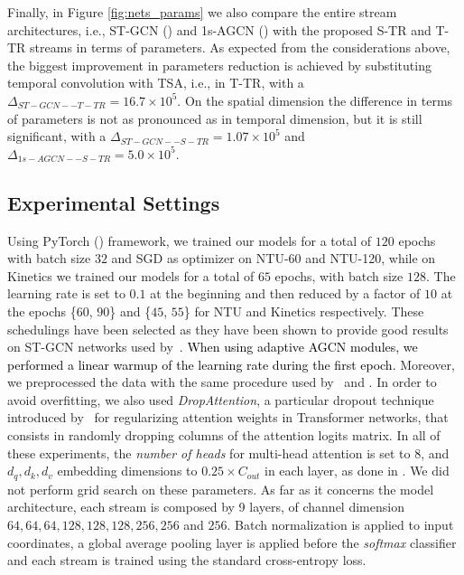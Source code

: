 \documentclass[times,twocolumn,final,authoryear]{elsarticle}
\DeclareRobustCommand{\new}[1]
{{\textcolor{black}{#1}}}
\begin{document}
Finally, in Figure \ref{fig:nets_params} we also compare the entire stream architectures, i.e., ST-GCN (\cite{yan2018spatial}) and 1s-AGCN (\cite{Shi2018TwoStreamAG}) with the proposed S-TR and T-TR streams in terms of parameters.
As expected from the considerations above, the biggest improvement in parameters reduction is achieved by substituting temporal convolution with TSA, i.e., in T-TR, with a $\Delta_{ST-GCN--T-TR}=16.7\times10^5$. On the spatial dimension the difference in terms of parameters is not as pronounced as in temporal dimension, but it is still significant, with a $\Delta_{ST-GCN--S-TR}=1.07\times10^5$ and $\Delta_{1s-AGCN--S-TR}=5.0\times10^5$. 



\subsection{{Experimental Settings}} Using PyTorch (\cite{paszke2019pytorch}) framework, we trained our models for a total of $120$ epochs with batch size $32$ and SGD as optimizer on NTU-60 and NTU-120, while on Kinetics we trained our models for a total of $65$ epochs, with batch size $128$. The learning rate is set to $0.1$ at the beginning and then reduced by a factor of $10$ at the epochs \{$60$, $90$\} and \{$45$, $55$\} for NTU and Kinetics respectively. These schedulings have been selected as they have been shown to provide good results on ST-GCN networks used by~\cite{dirgraph}. \new{When using adaptive AGCN modules, we performed a linear warmup of the learning rate during the first epoch.} Moreover, we preprocessed the data with the same procedure used by~\cite{Shi2018TwoStreamAG} and \cite{dirgraph}. In order to avoid overfitting, we also used \textit{DropAttention}, a particular dropout technique introduced by~\cite{Lin2019DropAttentionAR} for regularizing attention weights in Transformer networks, that consists in randomly dropping columns of the attention logits matrix. In all of these experiments, the \textit{number of heads} for multi-head attention is set to $8$, and $d_q, d_k, d_v$ embedding dimensions to $0.25 \times C_{out}$ in each layer, as done in \cite{DBLP:journals/corr/abs-1904-09925}. We did not perform grid search on these parameters. As far as it concerns the model architecture, each stream is composed by 9 layers, of channel dimension $64, 64, 64, 128, 128, 128, 256, 256$ and $256$. Batch normalization is applied to input coordinates, a global average pooling layer is applied before the \textit{softmax} classifier and each stream is trained using the standard cross-entropy loss.
\end{document}
